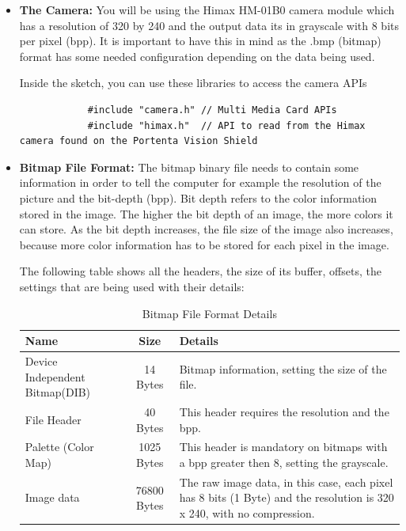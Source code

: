 \documentclass[10pt, a4paper]{beamer}
\begin{document}
		\begin{itemize}
			\item \textbf{The Camera:} You will be using the Himax HM-01B0 camera module which has a resolution of 320 by 240 and the output data its in grayscale with 8 bits per pixel (bpp). It is important to have this in mind as the .bmp (bitmap) format has some needed configuration depending on the data being used.
			
			Inside the sketch, you can use these libraries to access the camera APIs
			\begin{verbatim}
			#include "camera.h" // Multi Media Card APIs
			#include "himax.h"  // API to read from the Himax camera found on the Portenta Vision Shield
			\end{verbatim}			
				
			\item \textbf{Bitmap File Format:} The bitmap binary file needs to contain some information in order to tell the computer for example the resolution of the picture and the bit-depth (bpp). Bit depth refers to the color information stored in the image. The higher the bit depth of an image, the more colors it can store. As the bit depth increases, the file size of the image also increases, because more color information has to be stored for each pixel in the image.
				
			The following table shows all the headers, the size of its buffer, offsets, the settings that are being used with their details:
			\begin{table}[h!]
				\centering
				\begin{tabular}{|l|c|l|}
					\hline
					\textbf{Name} & \textbf{Size} & \textbf{Details} \\
					\hline
					Device Independent Bitmap(DIB) & 14 Bytes & Bitmap information, setting the size of the file. \\
					\hline
					File Header & 40 Bytes & This header requires the resolution and the bpp. \\
					\hline
					Palette (Color Map) & 1025 Bytes & This header is mandatory on bitmaps with a bpp greater then 8, setting the grayscale. \\
					\hline
					Image data & 76800 Bytes & The raw image data, in this case, each pixel has 8 bits (1 Byte) and the resolution is 320 x 240, with no compression. \\
					\hline
				\end{tabular}
				\caption{Bitmap File Format Details}
			\end{table}
			
		\end{itemize}	
	
\end{document}
